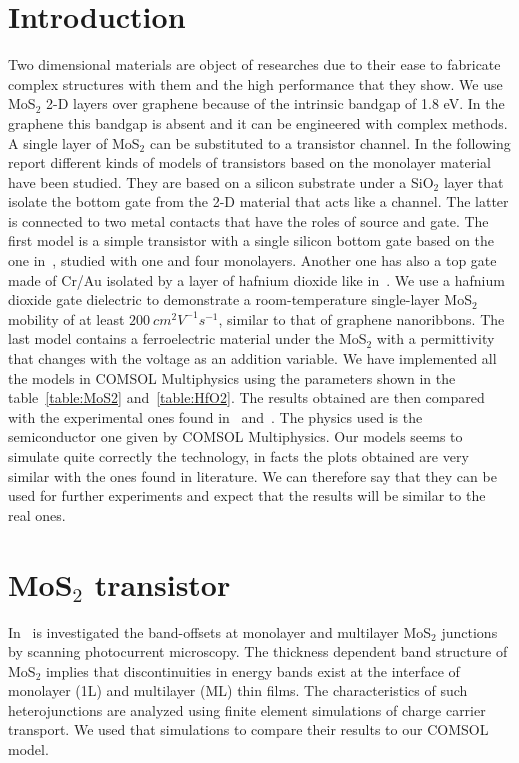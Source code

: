 \documentclass[12pt,a4paper,titlepage]{article}
\begin{document}
\section{Introduction}
Two dimensional materials are object of researches due to their ease to fabricate complex structures with them and the high performance that they show.
We use MoS$_2$ 2-D layers over graphene because of the intrinsic bandgap of 1.8 eV. In the graphene this bandgap is absent and it can be engineered with complex methods.
A single layer of MoS$_2$ can be substituted to a transistor channel.
In the following report different kinds of models of transistors based on the monolayer material have been studied.
They are based on a silicon substrate under a SiO$_2$ layer that isolate the bottom gate from the 2-D material that acts like a channel. The latter is connected to two metal contacts that have the roles of source and gate.
The first model is a simple transistor with a single silicon bottom gate based on the one in~\cite{Howell:MonolayerMultiLayer_MoS2}, studied with one and four monolayers.
Another one has also a top gate made of Cr/Au isolated by a layer of hafnium dioxide like in~\cite{Radisavljevic:Si_MoS2}.
We use a hafnium dioxide gate dielectric to demonstrate a room-temperature single-layer MoS$_2$ mobility of at least $200~cm^2 V^{-1} s^{-1}$, similar to that of graphene nanoribbons.
The last model contains a ferroelectric material under the MoS$_2$ with a permittivity that changes with the voltage as an addition variable.
We have implemented all the models in COMSOL Multiphysics using the parameters shown in the table~\ref{table:MoS2} and~\ref{table:HfO2}. The results obtained are then compared with the experimental ones found in~\cite{Howell:MonolayerMultiLayer_MoS2} and~\cite{Radisavljevic:Si_MoS2}. The physics used is the semiconductor one given by COMSOL Multiphysics.
Our models seems to simulate quite correctly the technology, in facts the plots obtained are very similar with the ones found in literature.
We can therefore say that they can be used for further experiments and expect that the results will be similar to the real ones.

\newpage
\section{MoS$_2$ transistor}

In~\cite{Howell:MonolayerMultiLayer_MoS2} is investigated the band-offsets at monolayer and multilayer MoS$_2$ junctions by scanning photocurrent microscopy. The thickness dependent band structure of MoS$_2$ implies that discontinuities in energy bands exist at the interface of monolayer (1L) and multilayer (ML) thin films. The characteristics of such heterojunctions are analyzed using finite element simulations of charge carrier transport. We used that simulations to compare their results to our COMSOL model.
\end{document}
